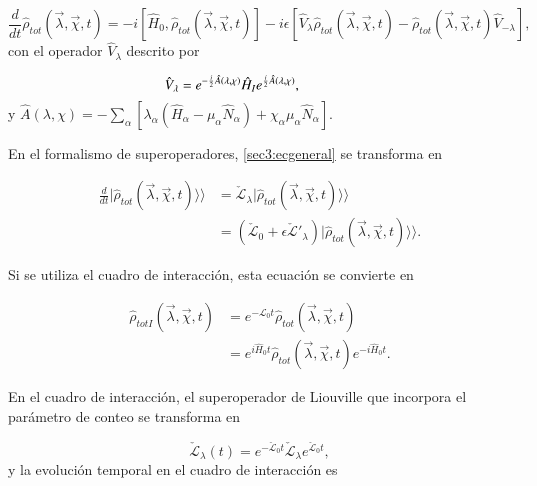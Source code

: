 \begin{equation}
    \frac{d}{dt}\hat{\rho}_{tot}(\vec{\lambda},\vec{\chi},t) = -i[\hat{H}_{0},\hat{\rho}_{tot}(\vec{\lambda},\vec{\chi},t)] - i\epsilon[\hat{V}_{\lambda} \hat{\rho}_{tot}(\vec{\lambda},\vec{\chi},t) - \hat{\rho}_{tot}(\vec{\lambda},\vec{\chi},t)\hat{V}_{-\lambda}],
    \label{sec3:ecgeneral}
\end{equation}
con el operador $\hat{V}_{\lambda}$ descrito por

\begin{equation*}
    \hat{V}_{\lambda} = e^{-\frac{i}{2}\hat{A}(\lambda,\chi)}\hat{H}_{I}e^{\frac{i}{2}\hat{A}(\lambda,\chi)}, \hspace{14mm}  
\end{equation*}
y $\hat{A}(\lambda,\chi) = -\sum_{\alpha}[\lambda_{\alpha}(\hat{H}_{\alpha} - \mu_{\alpha}\hat{N}_{\alpha}) + \chi_{\alpha}\mu_{\alpha}\hat{N}_{\alpha} ]$. 

En el formalismo de superoperadores, \ref{sec3:ecgeneral} se transforma en 

\begin{align*}
    \frac{d}{dt}|\hat{\rho}_{tot}(\vec{\lambda},\vec{\chi},t)\rangle \rangle  & = \check{\mathcal{L}}_{\lambda}|\hat{\rho}_{tot}(\vec{\lambda},\vec{\chi},t)\rangle \rangle  \\  
        & = (\check{\mathcal{L}}_{0} + \epsilon \check{\mathcal{L}}'_{\lambda} )|\hat{\rho}_{tot}(\vec{\lambda},\vec{\chi},t)\rangle \rangle. 
\end{align*}

Si se utiliza el cuadro de interacción, esta ecuación se convierte en  

\begin{align*}
    \hat{\rho}_{totI}(\vec{\lambda},\vec{\chi},t) & = e^{-\mathcal{L}_{0}t}\hat{\rho}_{tot}(\vec{\lambda},\vec{\chi},t) \\
    & = e^{i\hat{H}_{0}t}\hat{\rho}_{tot}(\vec{\lambda},\vec{\chi},t)e^{-i\hat{H}_{0}t}.
\end{align*}

En el cuadro de interacción, el superoperador de Liouville que incorpora el parámetro de conteo se transforma en 

\begin{equation*}
    \check{\mathcal{L}}_{\lambda}(t) = e^{-\check{\mathcal{L}}_{0}t}\check{\mathcal{L}}_{\lambda}e^{\check{\mathcal{L}}_{0}t},
\end{equation*}
y la evolución temporal en el cuadro de interacción es 

